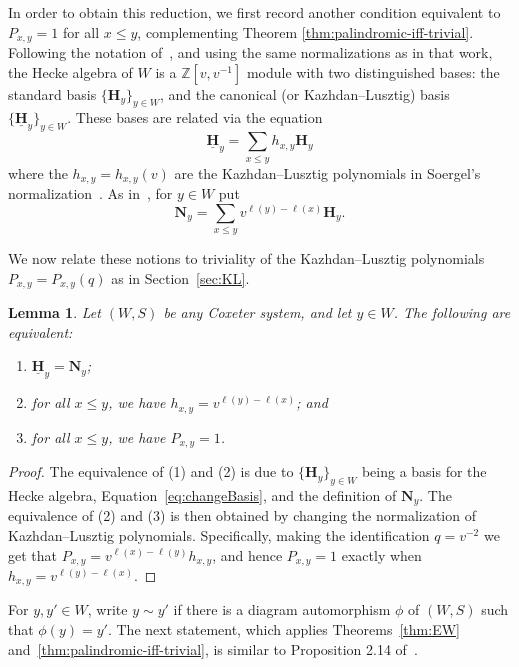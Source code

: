 \documentclass[11pt]{amsart}
\theoremstyle{plain}
\newtheorem{lemma}[thm]{Lemma}
\theoremstyle{definition}
\newcommand{\Z}{\mathbb{Z}}
\newcommand\KLbasis{\underline{\mathbf{H}}}
\newcommand\Hgen{\mathbf{H}}
\newcommand\Ngen{\mathbf{N}}
\newcommand{\Pxy}{P_{x,y}} %
\numberwithin{equation}{subsection}
\begin{document}
In order to obtain this reduction, we first record another condition equivalent to $\Pxy = 1$ for all $x \leq y$, complementing Theorem \ref{thm:palindromic-iff-trivial}. Following the notation of~\cite{LibedinskyPatimo}, and using the same normalizations as in that work, the Hecke algebra of $W$ is a $\Z[v,v^{-1}]$ module with two distinguished bases: the standard basis $\{ \Hgen_y\}_{y \in W}$, and the canonical (or Kazhdan--Lusztig) basis $\{ \KLbasis_y \}_{y \in W}$. These bases are related via the equation
\begin{equation}\label{eq:changeBasis}
\KLbasis_y = \sum_{x \leq y} h_{x,y} \Hgen_y
\end{equation}
where the $h_{x,y} = h_{x,y}(v)$ are the Kazhdan--Lusztig polynomials in Soergel's normalization~\cite{Soergel97}. As in~\cite{LibedinskyPatimo}, for $y \in W$ put 
\[
\Ngen_y = 
	\sum_{x\leq y} v^{\ell(y)-\ell(x)} \Hgen_y.
\]

We now relate these notions to triviality of the Kazhdan--Lusztig polynomials $\Pxy = \Pxy(q)$ as in Section~\ref{sec:KL}.

\begin{lemma}\label{lem:KLgenNgen} 
Let $(W,S)$ be any Coxeter system, and let $y \in W$. The following are equivalent:
\begin{enumerate}
\item $\KLbasis_y = \Ngen_y$;
\item for all $x \leq y$, we have $h_{x,y} = v^{\ell(y) - \ell(x)}$; and
\item for all $x \leq y$, we have $\Pxy = 1$.
\end{enumerate}
\end{lemma}
\begin{proof} 
The equivalence of (1) and (2) is due to $\{ \Hgen_y \}_{y \in W}$ being a basis for the Hecke algebra, Equation~\eqref{eq:changeBasis}, and the definition of $\Ngen_y$. The equivalence of (2) and (3) is then obtained by changing the normalization of Kazhdan--Lusztig polynomials. Specifically, making the identification $q = v^{-2}$ we get that $\Pxy = v^{\ell(x) - \ell(y)}h_{x,y}$, and hence $\Pxy = 1$ exactly when $h_{x,y} = v^{\ell(y) - \ell(x)}$.
\end{proof}

For $y,y' \in W$, write $y \sim y'$ if there is a diagram automorphism $\phi$ of $(W,S)$ such that $\phi(y) = y'$. The next statement, which applies Theorems~\ref{thm:EW} and~\ref{thm:palindromic-iff-trivial}, is similar to Proposition 2.14 of~\cite{BurrullLibedinskyPlaza}.
\end{document}
